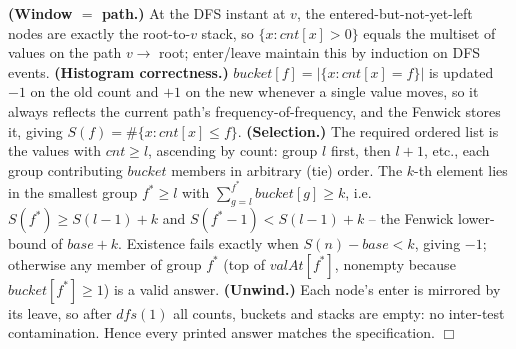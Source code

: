 \begin{proofbox}
\textbf{(Window $=$ path.)} At the DFS instant at \(v\), the entered-but-not-yet-left nodes
are exactly the root-to-\(v\) stack, so \(\{x:\mathit{cnt}[x]>0\}\) equals the multiset of
values on the path \(v\to\) root; enter/leave maintain this by induction on DFS events.
\textbf{(Histogram correctness.)} \(\mathit{bucket}[f]=|\{x:\mathit{cnt}[x]=f\}|\) is
updated \(-1\) on the old count and \(+1\) on the new whenever a single value moves, so it
always reflects the current path's frequency-of-frequency, and the Fenwick stores it, giving
\(S(f)=\#\{x:\mathit{cnt}[x]\le f\}\). \textbf{(Selection.)} The required ordered list is the
values with \(\mathit{cnt}\ge l\), ascending by count: group \(l\) first, then \(l{+}1\), etc.,
each group contributing \(\mathit{bucket}\) members in arbitrary (tie) order. The \(k\)-th
element lies in the smallest group \(f^\ast\ge l\) with \(\sum_{g=l}^{f^\ast}\mathit{bucket}[g]\ge k\),
i.e.\ \(S(f^\ast)\ge S(l-1)+k\) and \(S(f^\ast{-}1)<S(l-1)+k\) -- the Fenwick lower-bound of
\(\mathit{base}+k\). Existence fails exactly when \(S(n)-\mathit{base}<k\), giving \(-1\);
otherwise any member of group \(f^\ast\) (top of \(\mathit{valAt}[f^\ast]\), nonempty because
\(\mathit{bucket}[f^\ast]\ge1\)) is a valid answer. \textbf{(Unwind.)} Each node's enter is
mirrored by its leave, so after \(\mathit{dfs}(1)\) all counts, buckets and stacks are empty:
no inter-test contamination. Hence every printed answer matches the specification. \(\Box\)
\end{proofbox}

